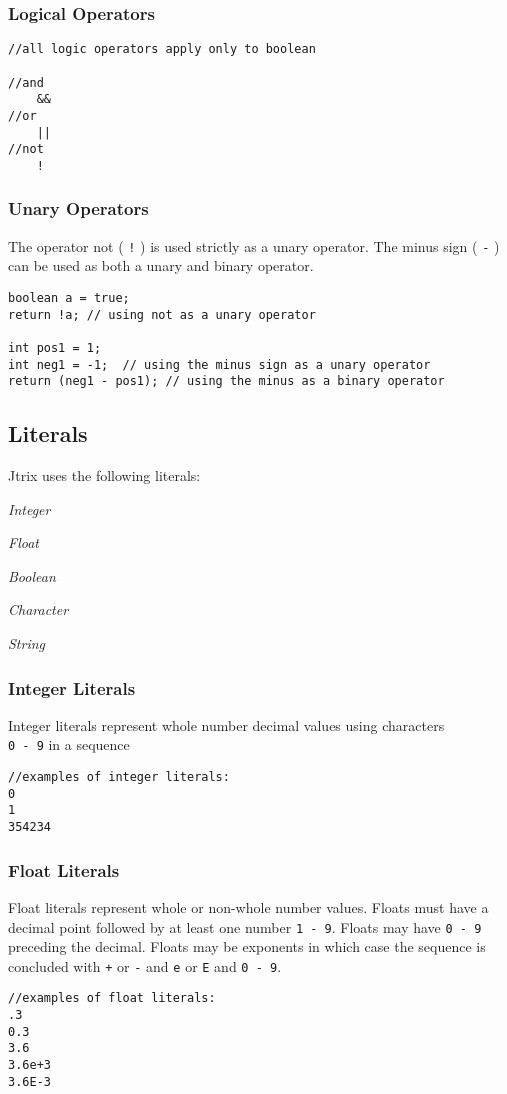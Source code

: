 \documentclass[12pt]{report}
\begin{document}
{\subsubsection{Logical Operators}
\begin{lstlisting}
//all logic operators apply only to boolean

//and
	&&
//or
	||
//not
	!
\end{lstlisting}

\subsubsection{Unary Operators}
The operator not ( \texttt{!} ) is used strictly as a unary operator. The minus sign ( \texttt{-} ) can be used as both a unary and binary operator.
\begin{lstlisting}
boolean a = true;
return !a; // using not as a unary operator

int pos1 = 1; 
int neg1 = -1;  // using the minus sign as a unary operator
return (neg1 - pos1); // using the minus as a binary operator
\end{lstlisting}
\subsection{Literals}
Jtrix uses the following literals:

 \textit{Integer}

 \textit{Float}

 \textit{Boolean}

 \textit{Character}

 \textit{String}

\subsubsection{Integer Literals}
Integer literals represent whole number decimal values using characters \\ \texttt{0 - 9} in a sequence
\begin{lstlisting}
//examples of integer literals:
0
1
354234
\end{lstlisting}

\subsubsection{Float Literals}
Float literals represent whole or non-whole number values. Floats must have a decimal point followed by at least one number \texttt{1 - 9}. Floats may have \texttt{0 - 9} preceding the decimal. Floats may be exponents in which case the sequence is concluded with \texttt{+} or \texttt{-} and \texttt{e} or \texttt{E}  and \texttt{0 - 9}.
\begin{lstlisting}
//examples of float literals:
.3
0.3
3.6
3.6e+3
3.6E-3
\end{lstlisting}

}
\end{document}
